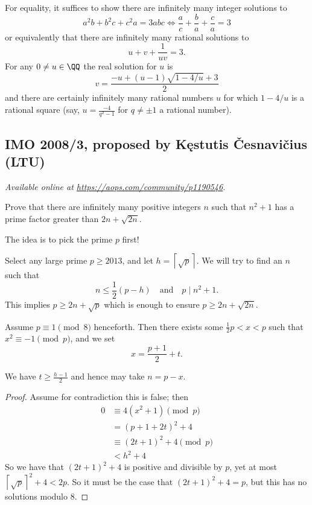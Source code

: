 \documentclass[11pt]{scrartcl}
\begin{document}
For equality, it suffices to show there are infinitely
many integer solutions to
\[ a^2b+b^2c+c^2a=3abc
  \iff \frac ac + \frac ba + \frac ca = 3
\]
or equivalently that
there are infinitely many rational solutions to
\[ u + v + \frac{1}{uv} = 3. \]
For any $0 \neq u \in \QQ$ the real solution for $u$ is
\[ v = \frac{-u + (u-1)\sqrt{1-4/u} + 3}{2} \]
and there are certainly infinitely many rational numbers $u$
for which $1-4/u$ is a rational square
(say, $u = \frac{-4}{q^2-1}$ for $q \neq \pm 1$ a rational number).
\pagebreak

\subsection{IMO 2008/3, proposed by Kęstutis Česnavičius (LTU)}
\textsl{Available online at \url{https://aops.com/community/p1190546}.}
\begin{mdframed}[style=mdpurplebox,frametitle={Problem statement}]
Prove that there are infinitely many positive integers $n$
such that $n^2+1$ has a prime factor greater than $2n + \sqrt{2n}$.
\end{mdframed}
The idea is to pick the prime $p$ first!

Select any large prime $p \ge 2013$,
and let $h = \left\lceil \sqrt p \right\rceil$.
We will try to find an $n$ such that
\[ n \le \frac 12 (p-h) \quad \text{and} \quad p \mid n^2+1. \]
This implies $p \ge 2n+\sqrt{p}$
which is enough to ensure $p \ge 2n + \sqrt{2n}$.

Assume $p \equiv 1 \pmod 8$ henceforth.
Then there exists some $\frac 12 p < x < p$
such that $x^2 \equiv -1 \pmod p$,
and we set \[ x = \frac{p+1}{2} + t. \]
\begin{claim*}
  We have $t \ge \frac{h-1}{2}$ and hence may take $n = p-x$.
\end{claim*}
\begin{proof}
Assume for contradiction this is false; then
\begin{align*}
  0 &\equiv  4(x^2+1) \pmod{p} \\
  &= \left( p+1+2t \right)^2 + 4 \\
  &\equiv (2t+1)^2 + 4 \pmod{p} \\
  &< h^2+4
\end{align*}
So we have that $(2t+1)^2+4$ is positive and divisible by $p$,
yet at most $\left\lceil \sqrt{p} \right\rceil^2 + 4 < 2p$.
So it must be the case that $(2t+1)^2+4 = p$,
but this has no solutions modulo $8$.
\end{proof}
\pagebreak
\end{document}
